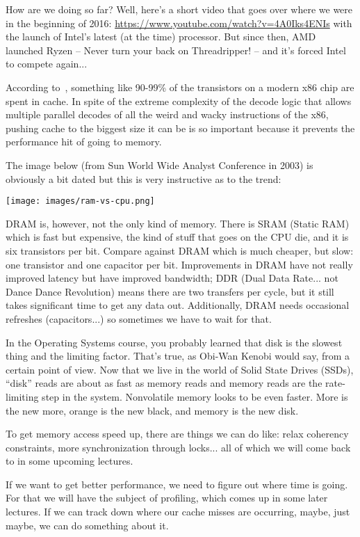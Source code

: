 How are we doing so far? Well, here's a short video that goes over where we were in the beginning of 2016: \url{https://www.youtube.com/watch?v=4A0Iks4ENIs} with the launch of Intel's latest (at the time) processor. But since then, AMD launched Ryzen -- Never turn your back on Threadripper! -- and it's forced Intel to compete again... 

According to~\cite{modern-hardware}, something like 90-99\% of the transistors on a modern x86 chip are spent in cache. In spite of the extreme complexity of the decode logic that allows multiple parallel decodes of all the weird and wacky instructions of the x86, pushing cache to the biggest size it can be is so important because it prevents the performance hit of going to memory.

The image below (from Sun World Wide Analyst Conference in 2003) is obviously a bit dated but this is very instructive as to the trend:
\begin{center}
\texttt{[image: images/ram-vs-cpu.png]}
\end{center}

DRAM is, however, not the only kind of memory. There is SRAM (Static RAM) which is fast but expensive, the kind of stuff that goes on the CPU die, and it is six transistors per bit. Compare against DRAM which is much cheaper, but slow: one transistor and one capacitor per bit. Improvements in DRAM have not really improved latency but have improved bandwidth; DDR (Dual Data Rate... not Dance Dance Revolution) means there are two transfers per cycle, but it still takes significant time to get any data out. Additionally, DRAM needs occasional refreshes (capacitors...) so sometimes we have to wait for that.

In the Operating Systems course, you probably learned that disk is the slowest thing and the limiting factor. That's true, as Obi-Wan Kenobi would say, from a certain point of view. Now that we live in the world of Solid State Drives (SSDs), ``disk'' reads are about as fast as memory reads and memory reads are the rate-limiting step in the system. Nonvolatile memory looks to be even faster. More is the new more, orange is the new black, and memory is the new disk.

To get memory access speed up, there are things we can do like: relax coherency constraints, more synchronization through locks... all of which we will come back to in some upcoming lectures. 

If we want to get better performance, we need to figure out where time is going. For that we will have the subject of profiling, which comes up in some later lectures. If we can track down where our cache misses are occurring, maybe, just maybe, we can do something about it. 

